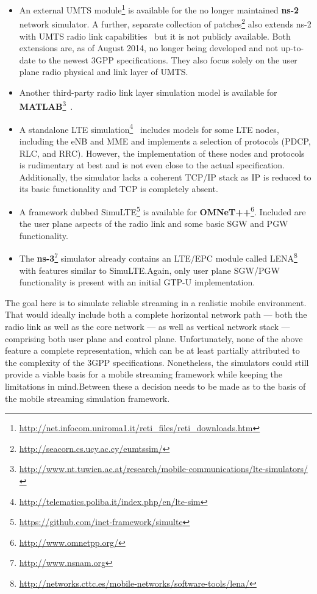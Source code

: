 \begin{itemize}
	\item An external \gls{UMTS} module\footnote{\url{http://net.infocom.uniroma1.it/reti_files/reti_downloads.htm}} is available for the no longer maintained \textbf{ns-2} network simulator. A further, separate collection of patches\footnote{\url{http://seacorn.cs.ucy.ac.cy/eumtssim/}} also extends ns-2 with \gls{UMTS} radio link capabilities~\cite{vranjevs2011use} but it is not publicly available. Both extensions are, as of August 2014, no longer being developed and not up-to-date to the newest \gls{3GPP} specifications. They also focus solely on the user plane radio physical and link layer of \gls{UMTS}.

	\item Another third-party radio link layer simulation model is available for \textbf{MATLAB}\footnote{\url{http://www.nt.tuwien.ac.at/research/mobile-communications/lte-simulators/}}~\cite{mehlfuhrer2011vienna}.

	\item A standalone \gls{LTE} simulation\footnote{\url{http://telematics.poliba.it/index.php/en/lte-sim}}~\cite{5634134} includes models for some \gls{LTE} nodes, including the \gls{eNB} and \gls{MME} and implements a selection of protocols (\gls{PDCP}, \gls{RLC}, and \gls{RRC}). However, the implementation of these nodes and protocols is rudimentary at best and is not even close to the actual specification. Additionally, the simulator lacks a coherent \gls{TCP}/\gls{IP} stack as \gls{IP} is reduced to its basic functionality and \gls{TCP} is completely absent.

	\item A framework dubbed SimuLTE\footnote{\url{https://github.com/inet-framework/simulte}} is available for \textbf{OMNeT++}\footnote{\url{http://www.omnetpp.org/}}. Included are the user plane aspects of the radio link and some basic \gls{SGW} and \gls{PGW} functionality.

	\item The \textbf{ns-3}\footnote{\url{http://www.nsnam.org}} simulator already contains an \gls{LTE}/\gls{EPC} module called LENA\footnote{\url{http://networks.cttc.es/mobile-networks/software-tools/lena/}}~\cite{Baldo:2013:OSM:2507924.2507940} with features similar to SimuLTE.\@ Again, only user plane \gls{SGW}/\gls{PGW} functionality is present with an initial \gls{GTP-U} implementation.
\end{itemize}

The goal here is to simulate reliable streaming in a realistic mobile environment. That would ideally include both a complete horizontal network path --- both the radio link as well as the core network --- as well as vertical network stack --- comprising both user plane and control plane. Unfortunately, none of the above feature a complete representation, which can be at least partially attributed to the complexity of the \gls{3GPP} specifications. Nonetheless, the simulators could still provide a viable basis for a mobile streaming framework while keeping the limitations in mind.Between these a decision needs to be made as to the basis of the mobile streaming simulation framework. 

